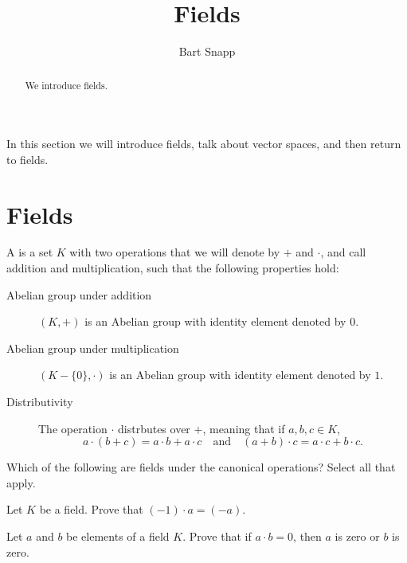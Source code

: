 \documentclass{ximera}
\author{Bart Snapp}
\title{Fields}
\begin{document}
\begin{abstract}
  We introduce fields.
\end{abstract}
\maketitle


In this section we will introduce fields, talk about vector spaces,
and then return to fields.


\section{Fields}


\begin{definition}
  A  is a set $K$ with two operations that we will denote
  by $+$ and $\cdot$, and call addition and multiplication, such that
  the following properties hold:
  \begin{description}
  \item[Abelian group under addition] $(K,+)$ is an Abelian
    group with identity element denoted by $0$.
  \item[Abelian group under multiplication] $(K-\{0\},\cdot)$ is
    an Abelian group with identity element denoted by $1$.
  \item[Distributivity] The operation $\cdot$ distrbutes over $+$,
    meaning that if $a,b,c\in K$,
    \[
    a\cdot (b+ c) = a\cdot b+ a\cdot c \quad\text{and}\quad (a+ b)\cdot c  = a\cdot c+ b\cdot c.
    \]
  \end{description}
\end{definition}

\begin{exercise} 
  Which of the following are fields under the canonical operations?
  Select all that apply.
  \begin{selectAll}
    \choice[correct]{$\Q$}
    \choice[correct]{$\R$}
    \choice[correct]{$\C$}
    \choice{$\Z$}
  \end{selectAll}
\end{exercise}

\begin{exercise}
  Let $K$ be a field. Prove that $(-1)\cdot a = (-a)$.
\end{exercise}


\begin{exercise} 
  Let $a$ and $b$ be elements of a field $K$. Prove that if $a\cdot b
  = 0$, then $a$ is zero or $b$ is zero. 
\end{exercise}
\end{document}
